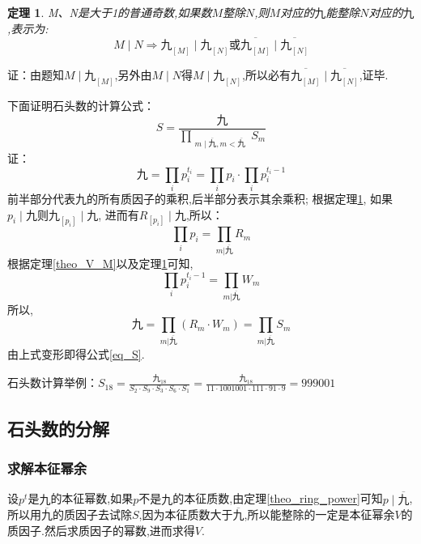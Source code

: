 \documentclass[a4paper]{article}
\newtheorem{theorem}{定理}[section]
\numberwithin{equation}{section}
\begin{document}
\begin{theorem} \label{theo_M_N} M、N是大于1的普通奇数,如果数$M$整除$N$,则$M$对应的$九$能整除$N$对应的$九$,表示为:
\begin{displaymath} M\mid N \Rightarrow 九_{[M]} \mid 九_{[N]} 或 \overline{九_{[M]}} \mid  \overline{九_{[N]}} \end {displaymath}
\end{theorem} 
证：由题知$M \mid 九_{[M]}$,另外由$M \mid N$得$M \mid  九_{[N]}$,所以必有$\overline{九_{[M]}} \mid  \overline{九_{[N]}}$,证毕.

下面证明石头数的计算公式：
\begin{equation} \label{eq_S}
			S=\frac{\displaystyle 九}
			{\displaystyle
			\prod_{\substack{m \mid \overline{九} ,m < \overline{九} }}S_{m}
			}
\end {equation}
证：\begin{displaymath}九=\prod_i p_i^{t_i}=\prod_i p_i \cdot \prod_i p_i^{t_i-1}\end{displaymath} 前半部分代表九的所有质因子的乘积,后半部分表示其余乘积; 
	根据定理\ref{theo_M_N}, 如果$p_i \mid 九$则$九_{[p_i]} \mid 九$, 进而有$R_{[p_i]} \mid 九$,所以：\begin{displaymath}\prod_i p_i=\prod_{m|\overline{九}} R_m\end{displaymath} 
根据定理\ref{theo_V_M}以及定理\ref{theo_M_N}可知,\begin{displaymath}\prod_i p_i^{t_i-1}=\prod_{m|\overline{九}} W_m\end{displaymath}    所以,\begin{displaymath}九=\prod_{m|\overline{九}}(R_m\cdot W_m)=\prod_{m|\overline{九}}S_m \end{displaymath}
由上式变形即得公式\ref{eq_S}.

石头数计算举例：$S_{18}=\frac{\displaystyle 九_{18}}{\displaystyle S_2 \cdot S_9 \cdot S_3 \cdot S_6 \cdot S_1}
=\frac{\displaystyle 九_{18}}{\displaystyle 11 \cdot 1001001 \cdot 111 \cdot 91 \cdot 9} = 999001$
\subsection{石头数的分解}
\label{sec_S}
\subsubsection{求解本征幂余}
\label{part_solve_intrinsic_power}
设$p^t$是$九$的本征幂数,如果$p$不是$九$的本征质数,由定理\ref{theo_ring_power}可知$p \mid \overline{九}$,所以用$\overline{九}$的质因子去试除$S$,因为本征质数大于$\overline{九}$,所以能整除的一定是本征幂余$V$的质因子.然后求质因子的幂数,进而求得$V$.
\end{document}
